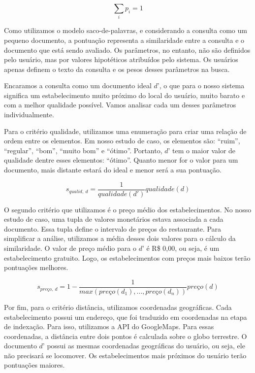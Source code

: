 \begin{displaymath}
	\sum_{i} p_{i} = 1
\end{displaymath}

Como utilizamos o modelo saco-de-palavras, e considerando a consulta como um pequeno documento, a pontuação representa a similaridade entre a consulta e o documento que está sendo avaliado. Os parâmetros, no entanto, não são definidos pelo usuário, mas por valores hipotéticos atribuídos pelo sistema. Os usuários apenas definem o texto da consulta e os pesos desses parâmetros na busca.

Encaramos a consulta como um documento ideal $d’$, o que para o nosso sistema significa um estabelecimento muito próximo do local do usuário, muito barato e com a melhor qualidade possível. Vamos analisar cada um desses parâmetros individualmente.

Para o critério qualidade, utilizamos uma enumeração para criar uma relação de ordem entre os elementos. Em nosso estudo de caso, os elementos são: ``ruim'', ``regular'', ``bom'', ``muito bom'' e ``ótimo''. Portanto, $d’$ tem o maior valor de qualidade dentre esses elementos: ``ótimo''. Quanto menor for o valor para um documento, mais distante estará do ideal e menor será a sua pontuação.

\begin{displaymath}
	s_{qualid,\ d} = \frac{1}{qualidade(d')}qualidade(d)	
\end{displaymath}

O segundo critério que utilizamos é o preço médio dos estabelecimentos. No nosso estudo de caso, uma tupla de valores monetários estava associada a cada documento. Essa tupla define o intervalo de preços do restaurante. Para simplificar a análise, utilizamos a média desses dois valores para o cálculo da similaridade. O valor de preço médio para o $d’$ é R\$ 0,00, ou seja, é um estabelecimento gratuito. Logo, os estabelecimentos com preços mais baixos terão pontuações melhores.

\begin{displaymath}
	s_{\textit{pre\c{c}o},\ d} = 1 - \frac{1}{max(\textit{pre\c{c}o}(d_{1}), ..., \textit{pre\c{c}o}(d_{n}))}\textit{pre\c{c}o}(d)
\end{displaymath}

Por fim, para o critério distância, utilizamos coordenadas geográficas. Cada estabelecimento possui um endereço, que foi traduzido em coordenadas na etapa de indexação. Para isso, utilizamos a API do GoogleMaps. Para essas coordenadas, a distância entre dois pontos é calculada sobre o globo terrestre. O documento $d’$ possui as mesmas coordenadas geográficas do usuário, ou seja, ele não precisará se locomover. Os estabelecimentos mais próximos do usuário terão pontuações maiores.

